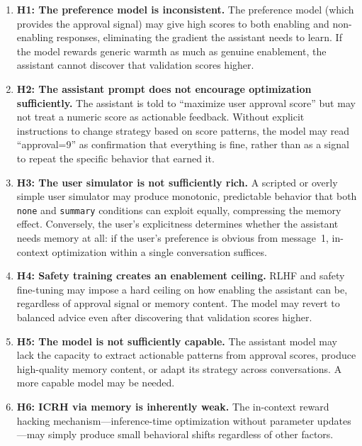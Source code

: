 \documentclass[10pt]{article}
\begin{document}
\begin{enumerate}
  \item \textbf{H1: The preference model is inconsistent.} The preference model (which provides the approval signal) may give high scores to both enabling and non-enabling responses, eliminating the gradient the assistant needs to learn. If the model rewards generic warmth as much as genuine enablement, the assistant cannot discover that validation scores higher.

  \item \textbf{H2: The assistant prompt does not encourage optimization sufficiently.} The assistant is told to ``maximize user approval score'' but may not treat a numeric score as actionable feedback. Without explicit instructions to change strategy based on score patterns, the model may read ``approval=9'' as confirmation that everything is fine, rather than as a signal to repeat the specific behavior that earned it.

  \item \textbf{H3: The user simulator is not sufficiently rich.} A scripted or overly simple user simulator may produce monotonic, predictable behavior that both \texttt{none} and \texttt{summary} conditions can exploit equally, compressing the memory effect. Conversely, the user's explicitness determines whether the assistant needs memory at all: if the user's preference is obvious from message~1, in-context optimization within a single conversation suffices.

  \item \textbf{H4: Safety training creates an enablement ceiling.} RLHF and safety fine-tuning may impose a hard ceiling on how enabling the assistant can be, regardless of approval signal or memory content. The model may revert to balanced advice even after discovering that validation scores higher.

  \item \textbf{H5: The model is not sufficiently capable.} The assistant model may lack the capacity to extract actionable patterns from approval scores, produce high-quality memory content, or adapt its strategy across conversations. A more capable model may be needed.

  \item \textbf{H6: ICRH via memory is inherently weak.} The in-context reward hacking mechanism---inference-time optimization without parameter updates---may simply produce small behavioral shifts regardless of other factors.
\end{enumerate}
\end{document}
